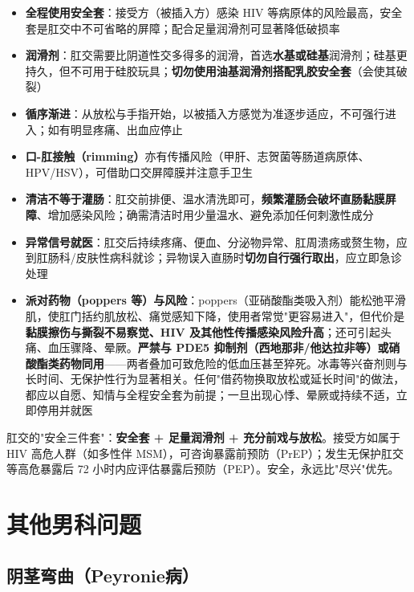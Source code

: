 \begin{itemize}[leftmargin=2cm]
	\item \textbf{全程使用安全套}：接受方（被插入方）感染 HIV 等病原体的风险最高，安全套是肛交中不可省略的屏障；配合足量润滑剂可显著降低破损率
	\item \textbf{润滑剂}：肛交需要比阴道性交多得多的润滑，首选\textbf{水基或硅基}润滑剂；硅基更持久，但不可用于硅胶玩具；\textbf{切勿使用油基润滑剂搭配乳胶安全套}（会使其破裂）
	\item \textbf{循序渐进}：从放松与手指开始，以被插入方感觉为准逐步适应，不可强行进入；如有明显疼痛、出血应停止
	\item \textbf{口-肛接触（rimming）}亦有传播风险（甲肝、志贺菌等肠道病原体、HPV/HSV），可借助口交屏障膜并注意手卫生
	\item \textbf{清洁不等于灌肠}：肛交前排便、温水清洗即可，\textbf{频繁灌肠会破坏直肠黏膜屏障}、增加感染风险；确需清洁时用少量温水、避免添加任何刺激性成分
	\item \textbf{异常信号就医}：肛交后持续疼痛、便血、分泌物异常、肛周溃疡或赘生物，应到肛肠科/皮肤性病科就诊；异物误入直肠时\textbf{切勿自行强行取出}，应立即急诊处理
	\item \textbf{派对药物（poppers 等）与风险}：poppers（亚硝酸酯类吸入剂）能松弛平滑肌，使肛门括约肌放松、痛觉感知下降，使用者常觉"更容易进入"，但代价是\textbf{黏膜擦伤与撕裂不易察觉、HIV 及其他性传播感染风险升高}；还可引起头痛、血压骤降、晕厥。\textbf{严禁与 PDE5 抑制剂（西地那非/他达拉非等）或硝酸酯类药物同用}——两者叠加可致危险的低血压甚至猝死。冰毒等兴奋剂则与长时间、无保护性行为显著相关。任何"借药物换取放松或延长时间"的做法，都应以自愿、知情与全程安全套为前提；一旦出现心悸、晕厥或持续不适，立即停用并就医
\end{itemize}

\begin{tcolorbox}[colback=pink!5!white,colframe=red!50!black,title=贴心小叮咛]
肛交的"安全三件套"：\textbf{安全套 + 足量润滑剂 + 充分前戏与放松}。接受方如属于 HIV 高危人群（如多性伴 MSM），可咨询暴露前预防（PrEP）；发生无保护肛交等高危暴露后 72 小时内应评估暴露后预防（PEP）。安全，永远比"尽兴"优先。
\end{tcolorbox}

\section{其他男科问题}
\subsection{阴茎弯曲（Peyronie病）}
\label{subsec:peyronie}

